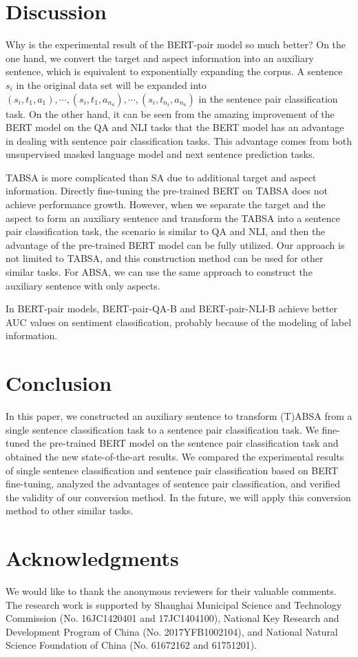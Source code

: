 \documentclass[11pt,a4paper]{article}
\theoremstyle{definition}
\begin{document}
	
	\section{Discussion}
	
	Why is the experimental result of the BERT-pair model so much better? On the one hand, we convert the target and aspect information into an auxiliary sentence, which is equivalent to exponentially expanding the corpus. A sentence $s_i$ in the original data set will be expanded into $(s_i, t_1, a_1),\cdots,(s_i, t_1, a_{n_a}),\cdots,(s_i, t_{n_t}, a_{n_a})$ in the sentence pair classification task. On the other hand, it can be seen from the amazing improvement of the BERT model on the QA and NLI tasks \cite{devlin2018bert} that the BERT model has an advantage in dealing with sentence pair classification tasks. This advantage comes from both unsupervised masked language model and next sentence prediction tasks.
	
	TABSA is more complicated than SA due to additional target and aspect information. Directly fine-tuning the pre-trained BERT on TABSA does not achieve performance growth. However, when we separate the target and the aspect to form an auxiliary sentence and transform the TABSA into a sentence pair classification task, the scenario is similar to QA and NLI, and then the advantage of the pre-trained BERT model can be fully utilized. Our approach is not limited to TABSA, and this construction method can be used for other similar tasks. For ABSA, we can use the same approach to construct the auxiliary sentence with only aspects.
	
	In BERT-pair models, BERT-pair-QA-B and BERT-pair-NLI-B achieve better AUC values on sentiment classification, probably because of the modeling of label information.
	
	\section{Conclusion}
	In this paper, we constructed an auxiliary sentence to transform (T)ABSA from a single sentence classification task to a sentence pair classification task. We fine-tuned the pre-trained BERT model on the sentence pair classification task and obtained the new state-of-the-art results. We compared the experimental results of single sentence classification and sentence pair classification based on BERT fine-tuning, analyzed the advantages of sentence pair classification, and verified the validity of our conversion method. In the future, we will apply this conversion method to other similar tasks.
	
	\section*{Acknowledgments}
	We would like to thank the anonymous reviewers for their valuable comments. The research work is supported by Shanghai Municipal Science and Technology Commission (No. 16JC1420401 and 17JC1404100),
	National Key Research and Development Program of China (No. 2017YFB1002104),
	and National Natural Science Foundation of China (No. 61672162 and 61751201).
	

	
\end{document}
